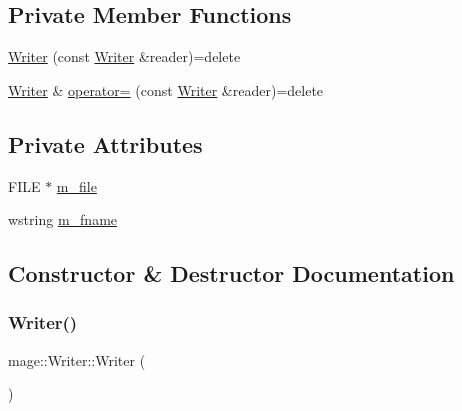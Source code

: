 \subsection*{Private Member Functions}
\begin{DoxyCompactItemize}
\item 
\hyperlink{classmage_1_1_writer_a0988d427f687ad5334c2ba74993e0d6e}{Writer} (const \hyperlink{classmage_1_1_writer}{Writer} \&reader)=delete
\item 
\hyperlink{classmage_1_1_writer}{Writer} \& \hyperlink{classmage_1_1_writer_a14fff6d050ad263bd351b26b86ca4186}{operator=} (const \hyperlink{classmage_1_1_writer}{Writer} \&reader)=delete
\end{DoxyCompactItemize}
\subsection*{Private Attributes}
\begin{DoxyCompactItemize}
\item 
F\+I\+LE $\ast$ \hyperlink{classmage_1_1_writer_a04428b72245b50d45c62cbd23c2f039a}{m\+\_\+file}
\item 
wstring \hyperlink{classmage_1_1_writer_afa271ee47897d4961e9d62132d8faeb5}{m\+\_\+fname}
\end{DoxyCompactItemize}


\subsection{Constructor \& Destructor Documentation}
\hypertarget{classmage_1_1_writer_a40b6cd3005d509e670c5a49272d9ef27}{}\label{classmage_1_1_writer_a40b6cd3005d509e670c5a49272d9ef27} 
\subsubsection{\texorpdfstring{Writer()}{Writer()}\hspace{0.1cm}{\footnotesize\ttfamily [1/2]}}
{\footnotesize\ttfamily mage\+::\+Writer\+::\+Writer (\begin{DoxyParamCaption}{ }\end{DoxyParamCaption})}

\hypertarget{classmage_1_1_writer_a04fe27246806384099d518231c75c09f}{}\label{classmage_1_1_writer_a04fe27246806384099d518231c75c09f} 
